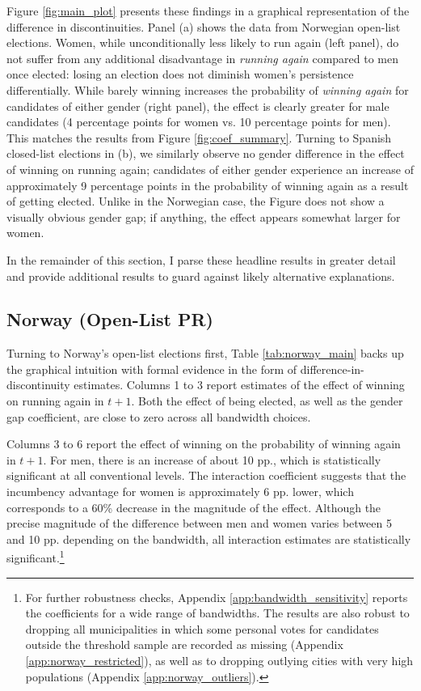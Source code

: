 \documentclass[12pt]{article}
\begin{document}
Figure \ref{fig:main_plot} presents these findings in a graphical representation of the difference in discontinuities. Panel (a) shows the data from Norwegian open-list elections. Women, while unconditionally less likely to run again (left panel), do not suffer from any additional disadvantage in \emph{running again} compared to men once elected:
losing an election does not diminish women's persistence differentially. While barely winning increases the probability of \emph{winning again} for candidates of either gender (right panel), the effect is clearly greater for male candidates (4 percentage points for women vs. 10 percentage points for men). This matches the results from Figure \ref{fig:coef_summary}. Turning to Spanish closed-list elections in (b), we similarly observe no gender difference in the effect of winning on running again; candidates of either gender experience an increase of approximately 9 percentage points in the probability of winning again as a result of getting elected. Unlike in the Norwegian case, the Figure does not show a visually obvious gender gap; if anything, the effect appears somewhat larger for women.

In the remainder of this section, I parse these headline results in greater detail and provide additional results to guard against likely alternative explanations.

\subsection{Norway (Open-List PR)}

Turning to Norway's open-list elections first, Table \ref{tab:norway_main} backs up the graphical intuition with formal evidence in the form of difference-in-discontinuity estimates. Columns 1 to 3 report estimates of the effect of winning on running again in $t + 1$. Both the effect of being elected, as well as the gender gap coefficient, are close to zero across all bandwidth choices.



Columns 3 to 6 report the effect of winning on the probability of winning again in $t + 1$. For men, there is an increase of about 10 pp., which is statistically significant at all conventional levels. The interaction coefficient suggests that the incumbency advantage for women is approximately 6 pp. lower, which corresponds to a 60\% decrease in the magnitude of the effect. Although the precise magnitude of the difference between men and women varies between 5 and 10 pp. depending on the bandwidth, all interaction estimates are statistically significant.\footnote{For further robustness checks, Appendix \ref{app:bandwidth_sensitivity} reports the coefficients for a wide range of bandwidths. The results are also robust to dropping all municipalities in which some personal votes for candidates outside the threshold sample are recorded as missing (Appendix \ref{app:norway_restricted}), as well as to dropping outlying cities with very high populations (Appendix \ref{app:norway_outliers}).}
\end{document}
